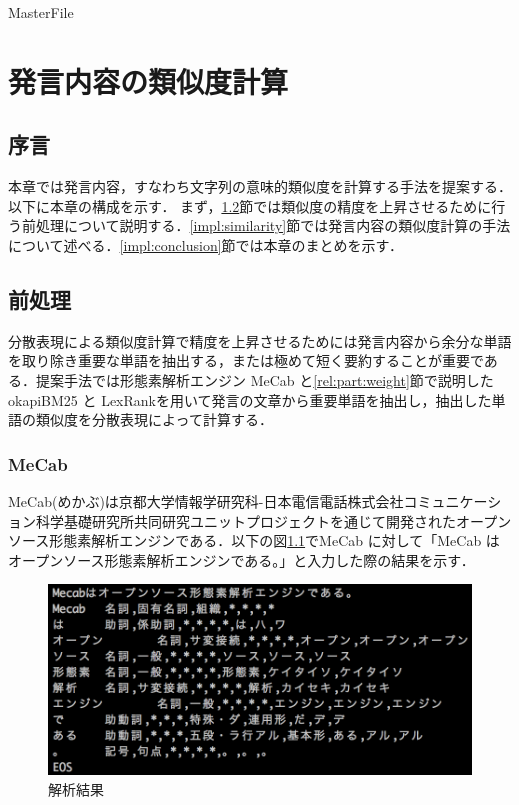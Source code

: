 \expandafter\ifx\csname MasterFile\endcsname\relax
	\def\SubFile{hoge}
	
	
	\setcounter{chapter}{3}
  \fi
  \cleardoublepage
\chapter{発言内容の類似度計算}

\label{impl:chapter}

\section{序言}
\label{impl:introduction}
本章では発言内容，すなわち文字列の意味的類似度を計算する手法を提案する．以下に本章の構成を示す．
まず，\ref{impl:preProcessing}節では類似度の精度を上昇させるために行う前処理について説明する．\ref{impl:similarity}節では発言内容の類似度計算の手法について述べる．\ref{impl:conclusion}節では本章のまとめを示す．

\section{前処理}
\label{impl:preProcessing}
分散表現による類似度計算で精度を上昇させるためには発言内容から余分な単語を取り除き重要な単語を抽出する，または極めて短く要約することが重要である．提案手法では形態素解析エンジン MeCab と\ref{rel:part:weight}節で説明したokapiBM25 と LexRankを用いて発言の文章から重要単語を抽出し，抽出した単語の類似度を分散表現によって計算する．
\subsection{MeCab}
MeCab(めかぶ)\cite{kudo2005mecab}は京都大学情報学研究科-日本電信電話株式会社コミュニケーション科学基礎研究所共同研究ユニットプロジェクトを通じて開発されたオープンソース形態素解析エンジンである．以下の図\ref{Fig:mecab}でMeCab に対して「MeCab はオープンソース形態素解析エンジンである。」と入力した際の結果を示す．
\begin{figure}[htbp]
 \begin{center}
  \includegraphics[width=\textwidth]{../images/4.Implementation/mecab.png}
  \caption{解析結果}
  \label{Fig:mecab}
  \vspace{-10pt}
 \end{center}
\end{figure}


